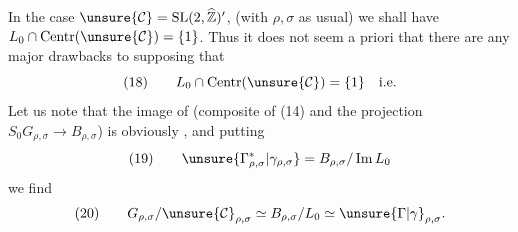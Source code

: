 In the case $\unsure{\mathcal{C}}=\mathrm{SL}(2,\widehat{\mathbb Z})'$, (with $\rho,\sigma$ as usual) we shall have $L_0\cap\mathrm{Centr}(\unsure{\mathcal{C}})=\{1\}$. Thus it does not seem a priori that there are any major drawbacks to supposing that
\[
(18)\qquad L_0\cap\mathrm{Centr}(\unsure{\mathcal{C}})=\{1\}\quad\text{i.e.}
\]
Let us note that  the image of
(composite of (14) and the projection $S_0G_{\rho,\sigma}\longrightarrow B_{\rho,\sigma}$) is obviously , and putting
\[
(19)\qquad\unsure{\Gamma_{\rho,\sigma}^{*}|\gamma_{\rho,\sigma}}=B_{\rho,\sigma}/\operatorname{Im}L_0
\]
we find
\[
(20)\qquad G_{\rho,\sigma}/\unsure{\mathcal{C}}_{\rho,\sigma}\simeq B_{\rho,\sigma}/L_0\simeq\unsure{\Gamma|\gamma}_{\rho,\sigma}.
\]

